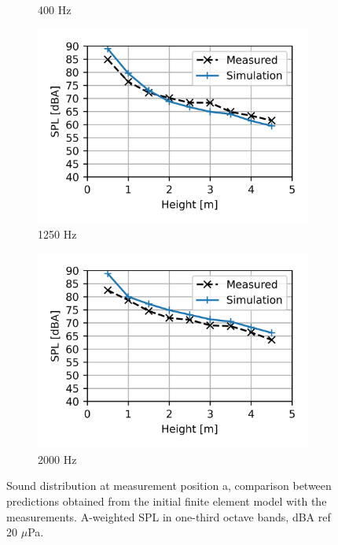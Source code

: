 \begin{figure}[H]
\begin{subfigure}[b]{0.49\textwidth}
		\caption{400 Hz}
	\end{subfigure}
	\begin{subfigure}[b]{0.49\textwidth}
		\centering
		\includegraphics{fig/chap5/initial_model/third_octave_over_height/1250_Hz.png}
		\caption{1250 Hz}
	\end{subfigure}
	\begin{subfigure}[b]{0.49\textwidth}
		\centering
		\includegraphics{fig/chap5/initial_model/third_octave_over_height/2000_Hz.png}
		\caption{2000 Hz}
	\end{subfigure}
	\caption{Sound distribution at measurement position a, comparison between predictions obtained from the initial finite element model with the measurements. A-weighted SPL in one-third octave bands, dBA ref 20 $\mu$Pa.}
	\label{fig:third_octave_over_height}
\end{figure}

